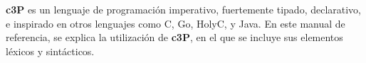 
\textbf{c3P} es un lenguaje de programación imperativo, fuertemente tipado,
declarativo, e inspirado en otros lenguajes como C, Go, HolyC, y Java. En
este manual de referencia, se explica la utilización de \textbf{c3P}, en
el que se incluye sus elementos léxicos y sintácticos.